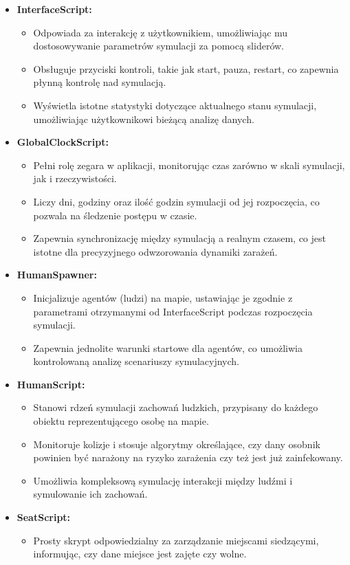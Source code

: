 \begin{itemize}
	\item \textbf{InterfaceScript:}
	\begin{itemize}
		\item Odpowiada za interakcję z użytkownikiem, umożliwiając mu dostosowywanie parametrów symulacji za pomocą sliderów.
		\item Obsługuje przyciski kontroli, takie jak start, pauza, restart, co zapewnia płynną kontrolę nad symulacją.
		\item Wyświetla istotne statystyki dotyczące aktualnego stanu symulacji, umożliwiając użytkownikowi bieżącą analizę danych.
	\end{itemize}
	
	\item \textbf{GlobalClockScript:}
	\begin{itemize}
		\item Pełni rolę zegara w aplikacji, monitorując czas zarówno w skali symulacji, jak i rzeczywistości.
		\item Liczy dni, godziny oraz ilość godzin symulacji od jej rozpoczęcia, co pozwala na śledzenie postępu w czasie.
		\item Zapewnia synchronizację między symulacją a realnym czasem, co jest istotne dla precyzyjnego odwzorowania dynamiki zarażeń.
	\end{itemize}
	
	\item \textbf{HumanSpawner:}
	\begin{itemize}
		\item Inicjalizuje agentów (ludzi) na mapie, ustawiając je zgodnie z parametrami otrzymanymi od InterfaceScript podczas rozpoczęcia symulacji.
		\item Zapewnia jednolite warunki startowe dla agentów, co umożliwia kontrolowaną analizę scenariuszy symulacyjnych.
	\end{itemize}
	
	\item \textbf{HumanScript:}
	\begin{itemize}
		\item Stanowi rdzeń symulacji zachowań ludzkich, przypisany do każdego obiektu reprezentującego osobę na mapie.
		\item Monitoruje kolizje i stosuje algorytmy określające, czy dany osobnik powinien być narażony na ryzyko zarażenia czy też jest już zainfekowany.
		\item Umożliwia kompleksową symulację interakcji między ludźmi i symulowanie ich zachowań.
	\end{itemize}
	
	\item \textbf{SeatScript:}
	\begin{itemize}
		\item Prosty skrypt odpowiedzialny za zarządzanie miejscami siedzącymi, informując, czy dane miejsce jest zajęte czy wolne.
	\end{itemize}
\end{itemize}

